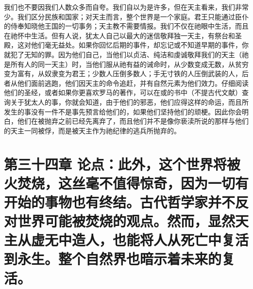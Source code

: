 我们也不要因我们人数众多而自夸。我们自以为是许多，但在天主看来，我们非常少。我们区分民族和国家；对天主而言，整个世界是一个家庭。君王只能通过臣仆的侍奉知晓他王国的一切事务；天主教不需要情报。我们不仅在祂眼中生活，而且在祂怀中生活。但有人说，犹太人自己以最大的迷信敬拜独一天主，有祭台和圣殿，这对他们毫无益处。如果你回忆后期的事件，却忘记或不知道早期的事件，你就犯了无知的罪。因为他们自己，当他们以贞洁、纯洁和虔诚敬拜我们的天主（祂是所有人的同一天主）时，当他们服从祂有益的诫命时，从少数变成无数，从贫穷变为富有，从奴隶变为君王；少数人压倒多数人；手无寸铁的人压倒武装的人，后者从他们面前逃跑，他们因天主的命令追赶，并有自然元素为他们效力。仔细阅读他们的圣经，或者如果你更喜欢罗马的著作，可以在或的书中（不提古代文献）查询关于犹太人的事，你就会知道，由于他们的邪恶，他们应得这样的命运，而且所发生的事没有一件不是事先预言给他们的，如果他们坚持他们的顽梗。因此你会明白，他们在被抛弃之前已经先离弃了，而且他们并不是像你亵渎所说的那样与他们的天主一同被俘，而是被天主作为祂纪律的逃兵所抛弃的。\par


\section{第三十四章 论点：此外，这个世界将被火焚烧，这丝毫不值得惊奇，因为一切有开始的事物也有终结。古代哲学家并不反对世界可能被焚烧的观点。然而，显然天主从虚无中造人，也能将人从死亡中复活到永生。整个自然界也暗示着未来的复活。}

